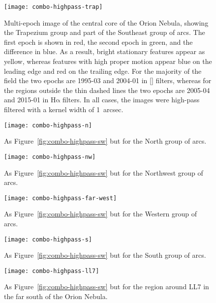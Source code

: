 \documentclass[apj, twocolumn]{aastex63}
\newcommand\oiii{[\ion{O}{3}]}
\newcommand\ha{\ensuremath{\mathrm{H\alpha}}}
\begin{document}
\begin{figure*}
  \centering
  \texttt{[image: combo-highpass-trap]}
  \caption{
    Multi-epoch image of the central core of the Orion Nebula,
    showing the Trapezium group and part of the Southeast group of arcs.
    The first epoch is shown in red, the second epoch in green, and the difference in blue.
    As a result, bright stationary features appear as yellow,
    whereas features with high proper motion
    appear blue on the leading edge and red on the trailing edge.
    For the majority of the field the two epochs are 1995-03 and 2004-01 in \oiii{} filters,
    whereas for the regions outside the thin dashed lines
    the two epochs are 2005-04 and 2015-01 in \ha{} filters.
    In all cases, the images were high-pass filtered with a kernel width of \SI{1}{arcsec}.
  }
  \label{fig:combo-highpass-trap}
\end{figure*}
\begin{figure}
  \centering
  \texttt{[image: combo-highpass-n]}
  \caption{
    As Figure~\ref{fig:combo-highpass-sw} but for the North group of arcs.
  }
  \label{fig:combo-highpass-n}
\end{figure}
\begin{figure*}
  \centering
  \texttt{[image: combo-highpass-nw]}
  \caption{
    As Figure~\ref{fig:combo-highpass-sw} but for the Northwest group of arcs.
  }
  \label{fig:combo-highpass-nw}
\end{figure*}
\begin{figure*}
  \centering
  \texttt{[image: combo-highpass-far-west]}
  \caption{
    As Figure~\ref{fig:combo-highpass-sw} but for the Western group of arcs.
  }
  \label{fig:combo-highpass-far-w}
\end{figure*}
\begin{figure*}
  \centering
  \texttt{[image: combo-highpass-s]}
  \caption{
    As Figure~\ref{fig:combo-highpass-sw} but for the South group of arcs.
  }
  \label{fig:combo-highpass-s}
\end{figure*}
\begin{figure*}
  \centering
  \texttt{[image: combo-highpass-ll7]}
  \caption{
    As Figure~\ref{fig:combo-highpass-sw} but for the region around LL7
    in the far south of the Orion Nebula.
  }
  \label{fig:combo-highpass-ll7}
\end{figure*}
\end{document}
